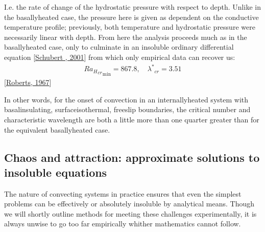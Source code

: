 \documentclass[letterpaper,10pt,english]{jupyterBook}
\begin{document}
\sphinxAtStartPar
I.e. the rate of change of the hydrostatic pressure with respect to depth. Unlike in the basally\sphinxhyphen{}heated case, the pressure here is given as dependent on the conductive temperature profile; previously, both temperature and hydrostatic pressure were necessarily linear with depth. From here the analysis proceeds much as in the basally\sphinxhyphen{}heated case, only to culminate in an insoluble ordinary differential equation {[}\hyperlink{cite.references:id663}{Schubert , 2001}{]} from which only empirical data can recover us:
\begin{equation*}
\begin{split} {{Ra_{H}}_{cr}}_{\min} = 867.8, \quad {\lambda^{*}}_{cr} = 3.51 \end{split}
\end{equation*}
\sphinxAtStartPar
{[}\hyperlink{cite.references:id675}{Roberts, 1967}{]}

\sphinxAtStartPar
In other words, for the onset of convection in an internally\sphinxhyphen{}heated system with basal\sphinxhyphen{}insulating, surface\sphinxhyphen{}isothermal, free\sphinxhyphen{}slip boundaries, the critical  number and characteristic wavelength are both a little more than one quarter greater than for the equivalent basally\sphinxhyphen{}heated case.


\subsection{Chaos and attraction: approximate solutions to insoluble equations}
\label{\detokenize{content/chapter_02_methods/section1:chaos-and-attraction-approximate-solutions-to-insoluble-equations}}
\sphinxAtStartPar
The nature of convecting systems in practice ensures that even the simplest problems can be effectively or absolutely insoluble by analytical means. Though we will shortly outline methods for meeting these challenges experimentally, it is always unwise to go too far empirically whither mathematics cannot follow.
\end{document}
